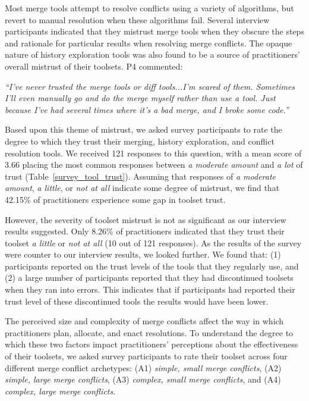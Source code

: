 Most merge tools attempt to resolve conflicts using a variety of algorithms, but revert to manual resolution when these algorithms fail.
Several interview participants indicated that they mistrust merge tools when they obscure the steps and rationale for particular results when resolving merge conflicts.
The opaque nature of history exploration tools was also found to be a source of practitioners' overall mistrust of their toolsets.
P4 commented:
\begin{displayquote}
\textit{``I've never trusted the merge tools or diff tools...I'm scared of them. Sometimes I'll even manually go and do the merge myself rather than use a tool. Just because I've had several times where it's a bad merge, and I broke some code.''}
\end{displayquote}

Based upon this theme of mistrust, we asked survey participants to rate the degree to which they trust their merging, history exploration, and conflict resolution tools.
We received 121 responses to this question, with a mean score of 3.66 placing the most common responses between \textit{a moderate amount} and \textit{a lot} of trust (Table~\ref{survey_tool_trust}).
Assuming that responses of \textit{a moderate amount}, \textit{a little}, or \textit{not at all} indicate some degree of mistrust, we find that 42.15\% of practitioners experience some gap in toolset trust.

However, the severity of toolset mistrust is not as significant as our interview results suggested.
Only 8.26\% of practitioners indicated that they trust their toolset \textit{a little} or \textit{not at all} (10 out of 121 responses).
As the results of the survey were counter to our interview results, we looked further. We found that: (1) participants reported on the trust levels of the tools that they regularly use, and (2) a large number of participants reported that they had discontinued toolsets when they ran into errors. This indicates that if participants had reported their trust level of these discontinued tools the results would have been lower.

\label{tool_effectiveness}
The perceived size and complexity of merge conflicts affect the way in which practitioners plan, allocate, and enact resolutions.
To understand the degree to which these two factors impact practitioners' perceptions about the effectiveness of their toolsets, we asked survey participants to rate their toolset across four different merge conflict archetypes: (A1) \textit{simple, small merge conflicts}, (A2) \textit{simple, large merge conflicts}, (A3) \textit{complex, small merge conflicts}, and (A4) \textit{complex, large merge conflicts}.

